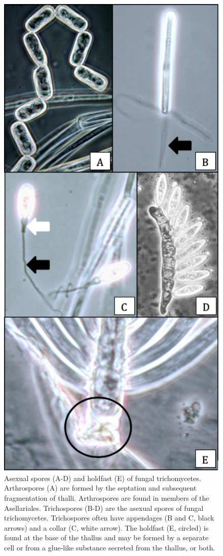 \documentclass[]{book}
\begin{document}
\begin{figure}

{\centering \includegraphics[width=4.71in]{img/Ch4_Fig3} 

}

\caption{Asexual spores (A-D) and holdfast (E) of fungal trichomycetes.  Arthrospores (A) are formed by the septation and subsequent fragmentation of thalli. Arthrospores are found in members of the Asellariales.  Trichospores (B-D) are the asexual spores of fungal trichomycetes. Trichospores often have appendages (B and C, black arrows) and a collar (C, white arrow).  The holdfast (E, circled) is found at the base of the thallus and may be formed by a separate cell or from a glue-like substance secreted from the thallus, or both.}\label{fig:ch4fig3}
\end{figure}
\end{document}
